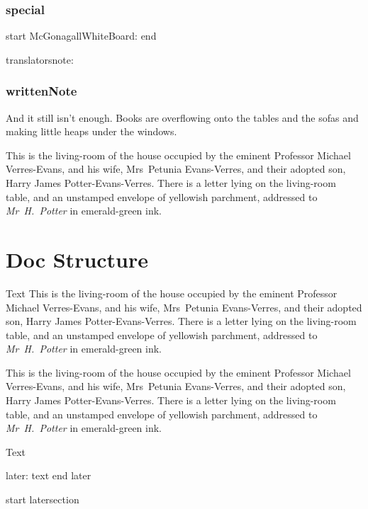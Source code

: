 \section{special}
start McGonagallWhiteBoard:  end

translatorsnote:

\section{writtenNote}
\begin{writtenNote}
And it still isn’t enough. Books are overflowing onto the tables and the sofas and making little heaps under the windows.

This is the living-room of the house occupied by the eminent Professor Michael Verres-Evans, and his wife, Mrs~Petunia Evans-Verres, and their adopted son, Harry James Potter-Evans-Verres. There is a letter lying on the living-room table, and an unstamped envelope of yellowish parchment, addressed to \emph{Mr~H.~Potter} in emerald-green ink.
\end{writtenNote}

\part{Doc Structure}

Text
This is the living-room of the house occupied by the eminent Professor Michael Verres-Evans, and his wife, Mrs~Petunia Evans-Verres, and their adopted son, Harry James Potter-Evans-Verres. There is a letter lying on the living-room table, and an unstamped envelope of yellowish parchment, addressed to \emph{Mr~H.~Potter} in emerald-green ink.

This is the living-room of the house occupied by the eminent Professor Michael Verres-Evans, and his wife, Mrs~Petunia Evans-Verres, and their adopted son, Harry James Potter-Evans-Verres. There is a letter lying on the living-room table, and an unstamped envelope of yellowish parchment, addressed to \emph{Mr~H.~Potter} in emerald-green ink.

Text

later: text \later end later


start latersection










